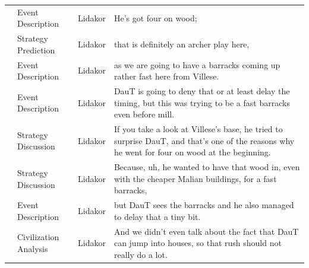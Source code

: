 {\begin{longtable}{@{}>{\theAppRow}r|L{2.3cm}L{1.0cm}U{11.55cm}@{}}
    & Event Description     & Lidakor & He's got four on wood;                                                                                                                                                                                                                                                                          \\
    & Strategy Prediction   & Lidakor & that is definitely an archer play here,                                                                                                                                                                                                                                                         \\
    & Event Description     & Lidakor & as we are going to have a barracks coming up rather fast here from Villese.                                                                                                                                                                                                                     \\
    & Event Description     & Lidakor & DauT is going to deny that or at least delay the timing, but this was trying to be a fast barracks even before mill.                                                                                                                                                                            \\
    & Strategy Discussion   & Lidakor & If you take a look at Villese's base, he tried to surprise DauT, and that's one of the reasons why he went for four on wood at the beginning.                                                                                                                                                   \\
    & Strategy Discussion   & Lidakor & Because, uh, he wanted to have that wood in, even with the cheaper Malian buildings, for a fast barracks,                                                                                                                                                                                       \\
    & Event Description     & Lidakor & but DauT sees the barracks and he also managed to delay that a tiny bit.                                                                                                                                                                                                                        \\
    & Civilization Analysis & Lidakor & And we didn't even talk about the fact that DauT can jump into houses, so that rush should not really do a lot.                                                                                                                                                                                 \\

\end{longtable}}
